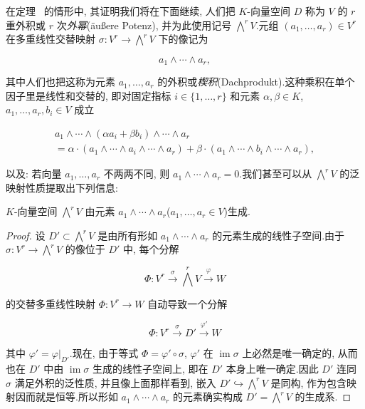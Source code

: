 在定理~ 的情形中, 其证明我们将在下面继续, 人们把 $K$-向量空间 $D$ 称为 $V$ 的 $r$ 重外积或 $r$ 次\emph{外幂}(\textup{äußere Potenz}), 并为此使用记号 $\bigwedge^r V$.元组 $(a_1, \ldots, a_r) \in V^r$ 在多重线性交替映射 $\sigma \colon V^r \longrightarrow \bigwedge^r V$ 下的像记为

\[
a_1 \wedge \cdots \wedge a_r,
\]

其中人们也把这称为元素 $a_1, \ldots, a_r$ 的外积或\emph{楔积}(\textup{Dachprodukt}).这种乘积在单个因子里是线性和交替的, 即对固定指标 $i \in \{1, \ldots, r\}$ 和元素 $\alpha, \beta \in K$, $a_1, \ldots, a_r, b_i \in V$ 成立

\[
\begin{array}{c}
a_1 \wedge \cdots \wedge (\alpha a_i + \beta b_i) \wedge \cdots \wedge a_r \\
= \alpha \cdot (a_1 \wedge \cdots \wedge a_i \wedge \cdots \wedge a_r) + \beta \cdot (a_1 \wedge \cdots \wedge b_i \wedge \cdots \wedge a_r),
\end{array}
\]

以及: 若向量 $a_1, \ldots, a_r$ 不两两不同, 则 $a_1 \wedge \cdots \wedge a_r = 0$.我们甚至可以从 $\bigwedge^r V$ 的泛映射性质提取出下列信息:

\begin{remark}\label{rem:4.5.3}
$K$-向量空间 $\bigwedge^r V$ 由元素 $a_1 \wedge \cdots \wedge a_r$($a_1, \ldots, a_r \in V$)生成.
\end{remark}

\begin{proof}
设 $D' \subset \bigwedge^r V$ 是由所有形如 $a_1 \wedge \cdots \wedge a_r$ 的元素生成的线性子空间.由于 $\sigma \colon V^r \longrightarrow \bigwedge^r V$ 的像位于 $D'$ 中, 每个分解

\[
\Phi \colon V^r \xrightarrow{\sigma} \bigwedge^r V \xrightarrow{\varphi} W
\]

的交替多重线性映射 $\Phi \colon V^r \longrightarrow W$ 自动导致一个分解

\[
\Phi \colon V^r \xrightarrow{\sigma} D' \xrightarrow{\varphi'} W
\]

其中 $\varphi' = \varphi|_{D'}$.现在, 由于等式 $\Phi = \varphi' \circ \sigma$, $\varphi'$ 在 $\operatorname{im} \sigma$ 上必然是唯一确定的, 从而也在 $D'$ 中由 $\operatorname{im} \sigma$ 生成的线性子空间上, 即在 $D'$ 本身上唯一确定.因此 $D'$ 连同 $\sigma$ 满足外积的泛性质, 并且像上面那样看到, 嵌入 $D' \hookrightarrow \bigwedge^r V$ 是同构, 作为包含映射因而就是恒等.所以形如 $a_1 \wedge \cdots \wedge a_r$ 的元素确实构成 $D' = \bigwedge^r V$ 的生成系.
\end{proof}

